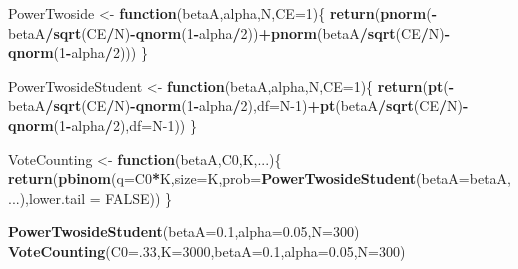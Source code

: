 \documentclass[]{book}
\newenvironment{Shaded}{\begin{snugshade}}{\end{snugshade}}
\newcommand{\ControlFlowTok}[1]{\textcolor[rgb]{0.13,0.29,0.53}{\textbf{#1}}}
\newcommand{\DataTypeTok}[1]{\textcolor[rgb]{0.13,0.29,0.53}{#1}}
\newcommand{\DecValTok}[1]{\textcolor[rgb]{0.00,0.00,0.81}{#1}}
\newcommand{\FloatTok}[1]{\textcolor[rgb]{0.00,0.00,0.81}{#1}}
\newcommand{\KeywordTok}[1]{\textcolor[rgb]{0.13,0.29,0.53}{\textbf{#1}}}
\newcommand{\NormalTok}[1]{#1}
\newcommand{\OperatorTok}[1]{\textcolor[rgb]{0.81,0.36,0.00}{\textbf{#1}}}
\newcommand{\OtherTok}[1]{\textcolor[rgb]{0.56,0.35,0.01}{#1}}
\newcommand{\StringTok}[1]{\textcolor[rgb]{0.31,0.60,0.02}{#1}}
\theoremstyle{definition}
\theoremstyle{definition}
\theoremstyle{definition}
\theoremstyle{remark}
\begin{document}
\begin{Shaded}
\begin{Highlighting}[]
\NormalTok{PowerTwoside <-}\StringTok{ }\ControlFlowTok{function}\NormalTok{(betaA,alpha,N,}\DataTypeTok{CE=}\DecValTok{1}\NormalTok{)\{}
  \KeywordTok{return}\NormalTok{(}\KeywordTok{pnorm}\NormalTok{(}\OperatorTok{-}\NormalTok{betaA}\OperatorTok{/}\KeywordTok{sqrt}\NormalTok{(CE}\OperatorTok{/}\NormalTok{N)}\OperatorTok{-}\KeywordTok{qnorm}\NormalTok{(}\DecValTok{1}\OperatorTok{-}\NormalTok{alpha}\OperatorTok{/}\DecValTok{2}\NormalTok{))}\OperatorTok{+}\KeywordTok{pnorm}\NormalTok{(betaA}\OperatorTok{/}\KeywordTok{sqrt}\NormalTok{(CE}\OperatorTok{/}\NormalTok{N)}\OperatorTok{-}\KeywordTok{qnorm}\NormalTok{(}\DecValTok{1}\OperatorTok{-}\NormalTok{alpha}\OperatorTok{/}\DecValTok{2}\NormalTok{)))}
\NormalTok{\}}

\NormalTok{PowerTwosideStudent <-}\StringTok{ }\ControlFlowTok{function}\NormalTok{(betaA,alpha,N,}\DataTypeTok{CE=}\DecValTok{1}\NormalTok{)\{}
  \KeywordTok{return}\NormalTok{(}\KeywordTok{pt}\NormalTok{(}\OperatorTok{-}\NormalTok{betaA}\OperatorTok{/}\KeywordTok{sqrt}\NormalTok{(CE}\OperatorTok{/}\NormalTok{N)}\OperatorTok{-}\KeywordTok{qnorm}\NormalTok{(}\DecValTok{1}\OperatorTok{-}\NormalTok{alpha}\OperatorTok{/}\DecValTok{2}\NormalTok{),}\DataTypeTok{df=}\NormalTok{N}\DecValTok{-1}\NormalTok{)}\OperatorTok{+}\KeywordTok{pt}\NormalTok{(betaA}\OperatorTok{/}\KeywordTok{sqrt}\NormalTok{(CE}\OperatorTok{/}\NormalTok{N)}\OperatorTok{-}\KeywordTok{qnorm}\NormalTok{(}\DecValTok{1}\OperatorTok{-}\NormalTok{alpha}\OperatorTok{/}\DecValTok{2}\NormalTok{),}\DataTypeTok{df=}\NormalTok{N}\DecValTok{-1}\NormalTok{))}
\NormalTok{\}}

\NormalTok{VoteCounting <-}\StringTok{ }\ControlFlowTok{function}\NormalTok{(betaA,C0,K,...)\{}
  \KeywordTok{return}\NormalTok{(}\KeywordTok{pbinom}\NormalTok{(}\DataTypeTok{q=}\NormalTok{C0}\OperatorTok{*}\NormalTok{K,}\DataTypeTok{size=}\NormalTok{K,}\DataTypeTok{prob=}\KeywordTok{PowerTwosideStudent}\NormalTok{(}\DataTypeTok{betaA=}\NormalTok{betaA,...),}\DataTypeTok{lower.tail =} \OtherTok{FALSE}\NormalTok{))}
\NormalTok{\}}

\KeywordTok{PowerTwosideStudent}\NormalTok{(}\DataTypeTok{betaA=}\FloatTok{0.1}\NormalTok{,}\DataTypeTok{alpha=}\FloatTok{0.05}\NormalTok{,}\DataTypeTok{N=}\DecValTok{300}\NormalTok{)}
\KeywordTok{VoteCounting}\NormalTok{(}\DataTypeTok{C0=}\NormalTok{.}\DecValTok{33}\NormalTok{,}\DataTypeTok{K=}\DecValTok{3000}\NormalTok{,}\DataTypeTok{betaA=}\FloatTok{0.1}\NormalTok{,}\DataTypeTok{alpha=}\FloatTok{0.05}\NormalTok{,}\DataTypeTok{N=}\DecValTok{300}\NormalTok{)}


\end{Highlighting}
\end{Shaded}
\end{document}
